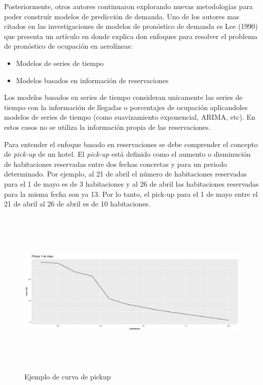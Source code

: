 {Posteriormente, otros autores continuaron explorando nuevas metodologías para poder construír modelos de predicción de demanda. Uno de los autores mas citados en las investigaciones de modelos de pronóstico de demanda es Lee (1990) que presenta un artículo en donde explica don enfoques para resolver el problema de pronóstico de ocupación en aerolíneas:
\begin{itemize}
  \item Modelos de series de tiempo 
  \item Modelos basados en información de reservaciones
\end{itemize}

Los modelos basados en series de tiempo consideran unicamente las series de tiempo con la información de llegadas o porcentajes de ocupación aplicandoles modelos de series de tiempo (como suavizamiento exponencial, ARIMA, etc). En estos casos no se utiliza la información propia de las reservaciones.


Para entender el enfoque basado en reservaciones se debe comprender el concepto de \emph{pick-up} de un hotel. El \emph{pick-up} está definido como el aumento o disminución de habitaciones reservadas entre dos fechas concretas y para un periodo determinado. Por ejemplo, al 21 de abril el número de habitaciones reservadas para el 1 de mayo es de 3 habitaciones y al 26 de abril las habitaciones reservadas para la misma fecha son ya 13.  Por lo tanto, el pick-up para el 1 de mayo entre el 21 de abril al 26 de abril es de 10 habitaciones.

\begin{figure}
  \centering
      \includegraphics[width=\maxwidth,height=8cm]{figures/pickupEjemplo.pdf} 
  \caption{Ejemplo de curva de pickup}
\end{figure}

}
